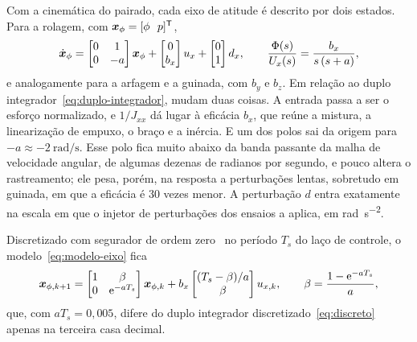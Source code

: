 Com a cinemática do pairado, cada eixo de atitude é descrito por dois estados.
Para a rolagem, com $\bm{x}_\phi = [\phi\ \ p]^{\mathsf{T}}$,
\begin{equation}
\dot{\bm{x}}_\phi =
\begin{bmatrix} 0 & 1 \\ 0 & -a \end{bmatrix} \bm{x}_\phi +
\begin{bmatrix} 0 \\ b_x \end{bmatrix} u_x +
\begin{bmatrix} 0 \\ 1 \end{bmatrix} d_x,
\qquad
\frac{\Phi(s)}{U_x(s)} = \frac{b_x}{s\,(s + a)},
\label{eq:modelo-eixo}
\end{equation}
e analogamente para a arfagem e a guinada, com $b_y$ e $b_z$. Em relação ao
duplo integrador~\eqref{eq:duplo-integrador}, mudam duas coisas. A entrada
passa a ser o esforço normalizado, e $1/J_{xx}$ dá lugar à eficácia $b_x$, que
reúne a mistura, a linearização de empuxo, o braço e a inércia. E um dos
polos sai da origem para $-a \approx \SI{-2}{\radian\per\second}$. Esse polo
fica muito abaixo da banda passante da malha de velocidade angular, de
algumas dezenas de radianos por segundo, e pouco altera o rastreamento; ele
pesa, porém, na resposta a perturbações lentas, sobretudo em guinada, em que
a eficácia é 30 vezes menor. A perturbação $d$ entra exatamente na escala em
que o injetor de perturbações dos ensaios a aplica, em
\si{\radian\per\second\squared}.

Discretizado com segurador de ordem zero~\cite{franklin1998} no período $T_s$
do laço de controle, o modelo~\eqref{eq:modelo-eixo} fica
\begin{equation}
\bm{x}_{\phi,k+1} =
\begin{bmatrix} 1 & \beta \\ 0 & \mathrm{e}^{-aT_s} \end{bmatrix} \bm{x}_{\phi,k} +
b_x \begin{bmatrix} (T_s - \beta)/a \\ \beta \end{bmatrix} u_{x,k},
\qquad
\beta = \frac{1 - \mathrm{e}^{-aT_s}}{a},
\label{eq:modelo-eixo-discreto}
\end{equation}
que, com $aT_s = 0{,}005$, difere do duplo integrador
discretizado~\eqref{eq:discreto} apenas na terceira casa decimal.

